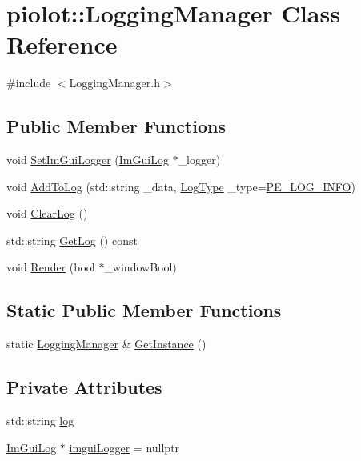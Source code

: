 \hypertarget{classpiolot_1_1_logging_manager}{}\section{piolot\+:\+:Logging\+Manager Class Reference}
\label{classpiolot_1_1_logging_manager}


{\ttfamily \#include $<$Logging\+Manager.\+h$>$}

\subsection*{Public Member Functions}
\begin{DoxyCompactItemize}
\item 
void \mbox{\hyperlink{classpiolot_1_1_logging_manager_aa0a0a7241a2d993282a18d7a8bded2ac}{Set\+Im\+Gui\+Logger}} (\mbox{\hyperlink{structpiolot_1_1_im_gui_log}{Im\+Gui\+Log}} $\ast$\+\_\+logger)
\item 
void \mbox{\hyperlink{classpiolot_1_1_logging_manager_a1678abfa124029b3825887e4730c6e82}{Add\+To\+Log}} (std\+::string \+\_\+data, \mbox{\hyperlink{namespacepiolot_a23b501c43e72ecf3dbf1146b2919c3a3}{Log\+Type}} \+\_\+type=\mbox{\hyperlink{namespacepiolot_a23b501c43e72ecf3dbf1146b2919c3a3af05c0e3d779fea0be15a1edd4814b4d9}{P\+E\+\_\+\+L\+O\+G\+\_\+\+I\+N\+FO}})
\item 
void \mbox{\hyperlink{classpiolot_1_1_logging_manager_a07a9311aef0e303169a6b2bbc1c62e9c}{Clear\+Log}} ()
\item 
std\+::string \mbox{\hyperlink{classpiolot_1_1_logging_manager_a3f59696c7ffafedf86c62bf497543b63}{Get\+Log}} () const
\item 
void \mbox{\hyperlink{classpiolot_1_1_logging_manager_a29156d923419bb4104d6f05784accb97}{Render}} (bool $\ast$\+\_\+window\+Bool)
\end{DoxyCompactItemize}
\subsection*{Static Public Member Functions}
\begin{DoxyCompactItemize}
\item 
static \mbox{\hyperlink{classpiolot_1_1_logging_manager}{Logging\+Manager}} \& \mbox{\hyperlink{classpiolot_1_1_logging_manager_a365a705c958728e638d446e55c3d721f}{Get\+Instance}} ()
\end{DoxyCompactItemize}
\subsection*{Private Attributes}
\begin{DoxyCompactItemize}
\item 
std\+::string \mbox{\hyperlink{classpiolot_1_1_logging_manager_a09a47d777f82d02c4420fc1832317e2b}{log}}
\item 
\mbox{\hyperlink{structpiolot_1_1_im_gui_log}{Im\+Gui\+Log}} $\ast$ \mbox{\hyperlink{classpiolot_1_1_logging_manager_a931c51fe236e3856d28b450d250cea8d}{imgui\+Logger}} = nullptr
\end{DoxyCompactItemize}


